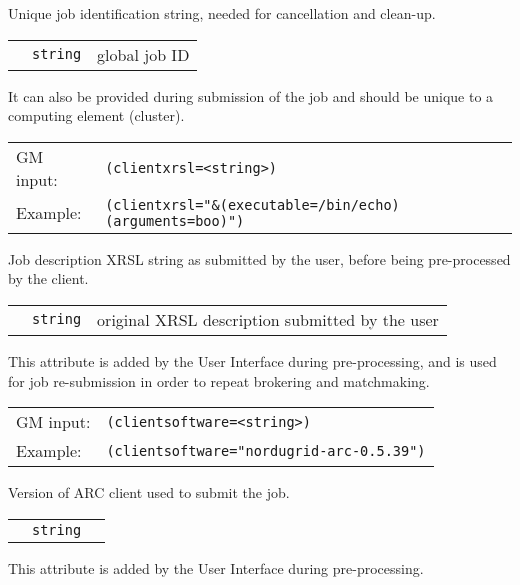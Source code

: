   Unique job identification string, needed for cancellation and clean-up. 

  \begin{tabular}{llp{10cm}}
    \hspace*{1cm}&\texttt{string} & global job ID\\
  \end{tabular}

  It can also be provided during submission of the job and should be
  unique to a computing element (cluster).

  \hspace*{0.5cm}
  \begin{shaded}
  \end{shaded}
  \begin{tabular}{lp{13cm}}
    GM input:&\verb#(clientxrsl=<string>)#\\
    Example:&\verb#(clientxrsl="&(executable=/bin/echo)(arguments=boo)")#\\
  \end{tabular}

  Job description XRSL string as submitted by the user, before being pre-processed by the client. 

  \begin{tabular}{llp{10cm}}
    \hspace*{1cm}&\texttt{string} & original XRSL description submitted by the user\\
  \end{tabular}

  This attribute is added by the User Interface during pre-processing, and is used for job re-submission in order to repeat brokering and matchmaking.

  \hspace*{0.5cm}
  \begin{shaded}
  \end{shaded}
  \begin{tabular}{lp{13cm}}
    GM input:&\verb#(clientsoftware=<string>)#\\
    Example:&\verb#(clientsoftware="nordugrid-arc-0.5.39")#\\
  \end{tabular}

  Version of ARC client used to submit the job. 

  \begin{tabular}{llp{10cm}}
    \hspace*{1cm}&\texttt{string} & \\
  \end{tabular}

  This attribute is added by the User Interface during pre-processing.
